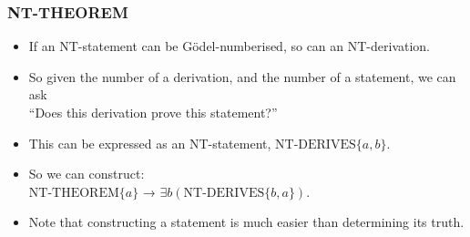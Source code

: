 \documentclass[mathserif]{beamer}
\begin{document}
\begin{frame}
\frametitle{NT-THEOREM}
\label{sec-4-4}

\pause
\begin{itemize}

\item If an NT-statement can be Gödel-numberised, so can an NT-derivation.\pause\\
\label{sec-4-4-1}%
\item So given the number of a derivation, and the number of a statement, we can ask\pause\\
\label{sec-4-4-2}%
``Does this derivation prove this statement?''\pause

\item This can be expressed as an NT-statement, $\text{NT-DERIVES}\{a,b\}$.\pause\\
\label{sec-4-4-3}%
\item So we can construct:\pause\\
\label{sec-4-4-4}%
$\text{NT-THEOREM}\{a\}$ → $∃b (\text{NT-DERIVES}\{b,a\})$.\pause

\item Note that constructing a statement is much easier than determining its truth.\\
\label{sec-4-4-5}%
\end{itemize} %
\end{frame}
\end{document}
